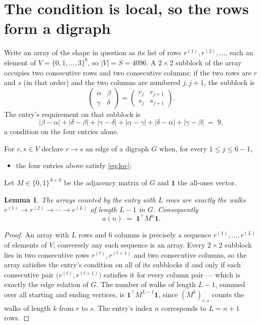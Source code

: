 \documentclass[11pt,a4paper]{article}
\theoremstyle{plain}
\newtheorem{lemma}[theorem]{Lemma}
\theoremstyle{definition}
\begin{document}
\section{The condition is local, so the rows form a digraph}

Write an array of the shape in question as its list of rows
$r^{(1)},r^{(2)},\dots$, each an element of
$V=\{0,1,\dots,3\}^{6}$, so $|V|=S=4096$. A $2\times2$ subblock of the array
occupies two consecutive rows and two consecutive columns; if the two rows are $r$
and $s$ (in that order) and the two columns are numbered $j,j+1$,
the subblock is
\[
\begin{pmatrix}\alpha&\beta\\\gamma&\delta\end{pmatrix}=\begin{pmatrix}r_j&r_{j+1}\\s_j&s_{j+1}\end{pmatrix}.
\]
The entry's requirement on that subblock is
\begin{equation}\label{eq:loc}
|\beta-\alpha|+|\delta-\beta|+|\gamma-\delta|+|\alpha-\gamma|+|\delta-\alpha|+|\gamma-\beta|\;=\;9,
\end{equation}
a condition on the four entries alone.

For $r,s\in V$ declare $r\to s$ an edge of a digraph $G$ when, for every
$1\le j\le 6-1$,
\begin{itemize}
\item the four entries above satisfy \eqref{eq:loc};

\end{itemize}
Let $M\in\{0,1\}^{S\times S}$ be the adjacency matrix of $G$ and $\mathbf{1}$ the
all-ones vector.

\begin{lemma}\label{lem:walk}
The arrays counted by the entry with $L$ rows are exactly the walks
$r^{(1)}\to r^{(2)}\to\cdots\to r^{(L)}$ of length $L-1$ in $G$. Consequently
\[
a(n)\;=\;\mathbf{1}^{\!\top}M^{n}\mathbf{1} .
\]
\end{lemma}

\begin{proof}
An array with $L$ rows and $6$ columns is precisely a sequence
$r^{(1)},\dots,r^{(L)}$ of elements of $V$; conversely any such sequence is an array.
Every $2\times2$ subblock lies in two consecutive rows $r^{(t)},r^{(t+1)}$ and two
consecutive columns, so the array satisfies the entry's condition on all of its subblocks
if and only if each consecutive pair $\bigl(r^{(t)},r^{(t+1)}\bigr)$ satisfies it for
every column pair --- which is exactly the edge relation of $G$. The number of walks of
length $L-1$, summed over all starting and ending vertices, is
$\mathbf{1}^{\!\top}M^{L-1}\mathbf{1}$, since $(M^{k})_{r,s}$ counts the walks of
length $k$ from $r$ to $s$. The entry's index $n$ corresponds to $L=n+1$ rows.
\end{proof}
\end{document}

